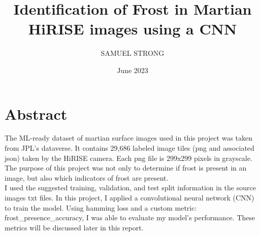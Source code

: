 \documentclass[11pt]{article}
\title{Identification of Frost in Martian HiRISE images using a CNN}
\author{SAMUEL STRONG}
\date{June 2023}
\begin{document}
\maketitle

\section{Abstract}
The ML-ready dataset of martian surface images used in this project was taken from JPL's dataverse. It contains 29,686 labeled image tiles (png and associated json) taken by the HiRISE camera. Each png file is 299x299 pixels in grayscale. The purpose of this project was not only to determine if frost is present in an image, but also which indicators of frost are present. 
\\
I used the suggested training, validation, and test split information in the source images txt files. In this project, I applied a convolutional neural network (CNN) to train the model. Using hamming loss and a custom metric: frost\_presence\_accuracy, I was able to evaluate my model's performance. These metrics will be discussed later in this report.
\end{document}
